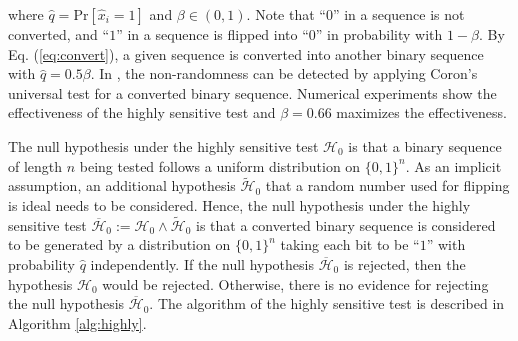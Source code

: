 %
where $\hat{q}=\mathrm{Pr}[\hat{x}_i=1]$ and $\beta \in (0,1)$. Note that ``$0$'' in a sequence is not converted, and ``$1$'' in a sequence is flipped into ``$0$'' in probability with $1-\beta$. By Eq. (\ref{eq:convert}), a given sequence is converted into another binary sequence with $\hat{q}=0.5\beta$. In \cite{yamamoto2016highly}, the non-randomness can be detected by applying Coron's universal test for a converted binary sequence.
Numerical experiments show the effectiveness of the highly sensitive test and $\beta=0.66$ maximizes the effectiveness.
%
%
\par
The null hypothesis under the highly sensitive test $\mathcal{H}_0$ is that a binary sequence of length $n$ being tested follows a uniform distribution on $\{0,1\}^n$. As an implicit assumption, an additional hypothesis $\widetilde{\mathcal{H}}_0$ that a random number used for flipping is ideal needs to be considered. Hence, the null hypothesis under the highly sensitive test $\overline{\mathcal{H}}_0:=\mathcal{H}_0 \land \widetilde{\mathcal{H}}_0$ is that a converted binary sequence is considered to be generated by a distribution on $\{0,1\}^n$ taking each bit to be ``$1$'' with probability $\hat{q}$ independently. If the null hypothesis $\overline{\mathcal{H}}_0$ is rejected, then the hypothesis $\mathcal{H}_0$ would be rejected. Otherwise, there is no evidence for rejecting the null hypothesis $\overline{\mathcal{H}}_0$. The algorithm of the highly sensitive test is described in Algorithm \ref{alg:highly}.
%

